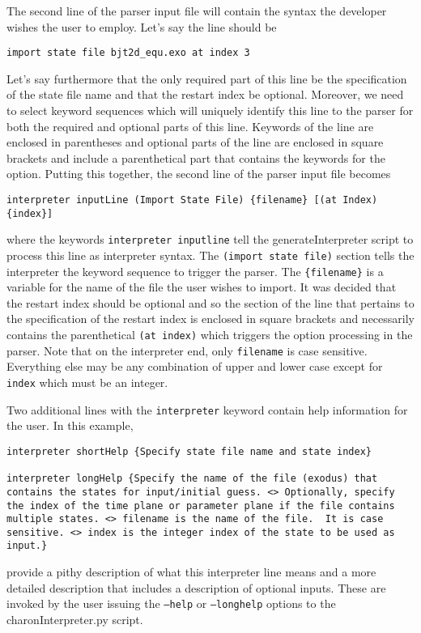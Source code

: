 The second line of the parser input file will contain the syntax the
developer wishes the user to employ.  Let's say the line should be
\begin{lstlisting}
import state file bjt2d_equ.exo at index 3
\end{lstlisting}
Let's say furthermore that the only required part of this line be the
specification of the state file name and that the restart index be
optional.  Moreover, we need to select keyword sequences which will
uniquely identify this line to the parser for both the required and
optional parts of this line.  Keywords of the line are enclosed in
parentheses and optional parts of the line are enclosed in square
brackets and include a parenthetical part that contains the keywords
for the option.  Putting this together, the second line of the parser
input file becomes
\begin{lstlisting}
interpreter inputLine (Import State File) {filename} [(at Index) {index}]
\end{lstlisting}
where the keywords \texttt{interpreter inputline} tell the
generateInterpreter script to process this line as interpreter syntax.
The \texttt{(import state file)} section tells the interpreter the
keyword sequence to trigger the parser.  The \texttt{\{filename\}} is
a variable for the name of the file the user wishes to import.  It was
decided that the restart index should be optional and so the section
of the line that pertains to the specification of the restart index is
enclosed in square brackets and necessarily contains the parenthetical
\texttt{(at index)} which triggers the option processing in the
parser.  Note that on the interpreter end, only \texttt{filename} is
case sensitive.  Everything else may be any combination of upper and
lower case except for \texttt{index} which must be an integer.

Two additional lines with the \texttt{interpreter} keyword contain
help information for the user.  In this example,
\begin{lstlisting}
interpreter shortHelp {Specify state file name and state index}

interpreter longHelp {Specify the name of the file (exodus) that contains the states for input/initial guess. <> Optionally, specify the index of the time plane or parameter plane if the file contains multiple states. <> filename is the name of the file.  It is case sensitive. <> index is the integer index of the state to be used as input.}
\end{lstlisting}
provide a pithy description of what this interpreter line means and a
more detailed description that includes a description of optional
inputs.  These are invoked by the user issuing the \texttt{--help} or
\texttt{--longhelp} options to the charonInterpreter.py script.


